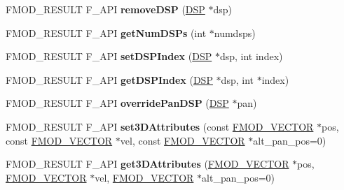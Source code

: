 \begin{DoxyCompactItemize}
\item 
\hypertarget{class_f_m_o_d_1_1_channel_control_afaad0596454ed0627e98b4fce72bd593}{F\+M\+O\+D\+\_\+\+R\+E\+S\+U\+L\+T F\+\_\+\+A\+P\+I {\bfseries remove\+D\+S\+P} (\hyperlink{class_f_m_o_d_1_1_d_s_p}{D\+S\+P} $\ast$dsp)}\label{class_f_m_o_d_1_1_channel_control_afaad0596454ed0627e98b4fce72bd593}

\item 
\hypertarget{class_f_m_o_d_1_1_channel_control_a8d818abc62a8839dae3d6dd782b23202}{F\+M\+O\+D\+\_\+\+R\+E\+S\+U\+L\+T F\+\_\+\+A\+P\+I {\bfseries get\+Num\+D\+S\+Ps} (int $\ast$numdsps)}\label{class_f_m_o_d_1_1_channel_control_a8d818abc62a8839dae3d6dd782b23202}

\item 
\hypertarget{class_f_m_o_d_1_1_channel_control_a0e667d534c4af622d2afdf5237541c72}{F\+M\+O\+D\+\_\+\+R\+E\+S\+U\+L\+T F\+\_\+\+A\+P\+I {\bfseries set\+D\+S\+P\+Index} (\hyperlink{class_f_m_o_d_1_1_d_s_p}{D\+S\+P} $\ast$dsp, int index)}\label{class_f_m_o_d_1_1_channel_control_a0e667d534c4af622d2afdf5237541c72}

\item 
\hypertarget{class_f_m_o_d_1_1_channel_control_a12ec28e3f98f5c58abc2c5a926572ea2}{F\+M\+O\+D\+\_\+\+R\+E\+S\+U\+L\+T F\+\_\+\+A\+P\+I {\bfseries get\+D\+S\+P\+Index} (\hyperlink{class_f_m_o_d_1_1_d_s_p}{D\+S\+P} $\ast$dsp, int $\ast$index)}\label{class_f_m_o_d_1_1_channel_control_a12ec28e3f98f5c58abc2c5a926572ea2}

\item 
\hypertarget{class_f_m_o_d_1_1_channel_control_a45b36878b9ad42fadeb26d606ea79797}{F\+M\+O\+D\+\_\+\+R\+E\+S\+U\+L\+T F\+\_\+\+A\+P\+I {\bfseries override\+Pan\+D\+S\+P} (\hyperlink{class_f_m_o_d_1_1_d_s_p}{D\+S\+P} $\ast$pan)}\label{class_f_m_o_d_1_1_channel_control_a45b36878b9ad42fadeb26d606ea79797}

\item 
\hypertarget{class_f_m_o_d_1_1_channel_control_a8de9f9459a04a145ddd12aac3889058f}{F\+M\+O\+D\+\_\+\+R\+E\+S\+U\+L\+T F\+\_\+\+A\+P\+I {\bfseries set3\+D\+Attributes} (const \hyperlink{struct_f_m_o_d___v_e_c_t_o_r}{F\+M\+O\+D\+\_\+\+V\+E\+C\+T\+O\+R} $\ast$pos, const \hyperlink{struct_f_m_o_d___v_e_c_t_o_r}{F\+M\+O\+D\+\_\+\+V\+E\+C\+T\+O\+R} $\ast$vel, const \hyperlink{struct_f_m_o_d___v_e_c_t_o_r}{F\+M\+O\+D\+\_\+\+V\+E\+C\+T\+O\+R} $\ast$alt\+\_\+pan\+\_\+pos=0)}\label{class_f_m_o_d_1_1_channel_control_a8de9f9459a04a145ddd12aac3889058f}

\item 
\hypertarget{class_f_m_o_d_1_1_channel_control_ae889a0ccee9653108836bfaf8b5fcbbd}{F\+M\+O\+D\+\_\+\+R\+E\+S\+U\+L\+T F\+\_\+\+A\+P\+I {\bfseries get3\+D\+Attributes} (\hyperlink{struct_f_m_o_d___v_e_c_t_o_r}{F\+M\+O\+D\+\_\+\+V\+E\+C\+T\+O\+R} $\ast$pos, \hyperlink{struct_f_m_o_d___v_e_c_t_o_r}{F\+M\+O\+D\+\_\+\+V\+E\+C\+T\+O\+R} $\ast$vel, \hyperlink{struct_f_m_o_d___v_e_c_t_o_r}{F\+M\+O\+D\+\_\+\+V\+E\+C\+T\+O\+R} $\ast$alt\+\_\+pan\+\_\+pos=0)}\label{class_f_m_o_d_1_1_channel_control_ae889a0ccee9653108836bfaf8b5fcbbd}


\end{DoxyCompactItemize}
